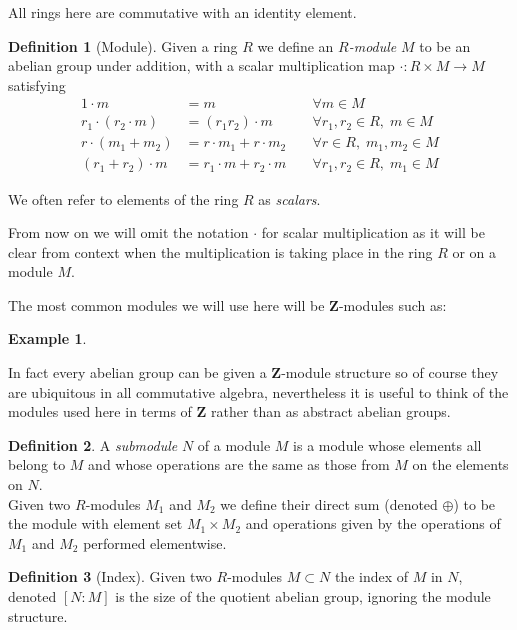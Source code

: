 \documentclass[a4paper,abstracton]{scrreprt}
\theoremstyle{definition}
\newtheorem{defn}{Definition}
\newtheorem{ex}{Example}
\newcommand{\ZZ}{\mathbf{Z}}
\begin{document}
All rings here are commutative with an identity element.
\begin{defn}[Module]
Given a ring $R$ we define an \emph{$R$-module} $M$ to be an abelian group under addition, with a scalar multiplication map $\cdot \colon R\times M \to M$ satisfying
\begin{align*}
1\cdot m &= m \; &&\forall m\in M \\
r_1\cdot(r_2 \cdot m) &= (r_1r_2)\cdot m \; &&\forall r_1,r_2\in R,\; m\in M \\
r\cdot(m_1 + m_2) &= r\cdot m_1 + r\cdot m_2 \; &&\forall r\in R, \; m_1,m_2\in M \\
(r_1 + r_2)\cdot m &= r_1\cdot m + r_2\cdot m \; &&\forall r_1,r_2\in R, \; m_1\in M
\end{align*}
\end{defn}

We often refer to elements of the ring $R$ as \emph{scalars}.

From now on we will omit the notation $\cdot$ for scalar multiplication as it will be clear from context when the multiplication is taking place in the ring $R$ or on a module $M$.

The most common modules we will use here will be $\ZZ$-modules such as:
\begin{ex}

\end{ex}
In fact every abelian group can be given a $\ZZ$-module structure so of course they are ubiquitous in all commutative algebra, nevertheless it is useful to think of the modules used here in terms of $\ZZ$ rather than as abstract abelian groups.\\

\begin{defn}
A \emph{submodule} $N$ of a module $M$ is a module whose elements all belong to $M$ and whose operations are the same as those from $M$ on the elements on $N$.\\
Given two $R$-modules $M_1$ and $M_2$ we define their direct sum (denoted $\oplus$) to be the module with element set $M_1 \times M_2$ and operations given by the operations of $M_1$ and $M_2$ performed elementwise.
\end{defn}

\begin{defn}[Index]
Given two $R$-modules $M \subset N$ the index of $M$ in $N$, denoted $[N\colon M]$ is the size of the quotient abelian group, ignoring the module structure.
\end{defn}
\end{document}
